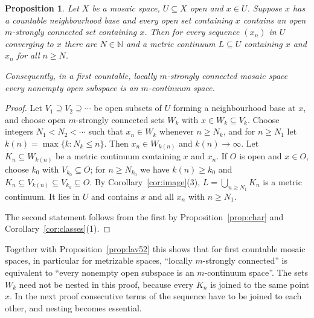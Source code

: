 \documentclass[11pt]{amsart}
\newtheorem{proposition}[theorem]{Proposition}
\theoremstyle{definition}
\theoremstyle{remark}
\newcommand{\N}{\mathbb{N}}
\numberwithin{equation}{section}
\begin{document}
\begin{proposition}\label{prop:fc}
Let $X$ be a mosaic space, $U\subseteq X$ open and $x\in U$. Suppose $x$ has a countable neighbourhood base and every open set containing $x$ contains an open $m$-strongly connected set containing $x$. Then for every sequence $(x_n)$ in $U$ converging to $x$ there are $N\in\N$ and a metric continuum $L\subseteq U$ containing $x$ and $x_n$ for all $n\ge N$.

Consequently, in a first countable, locally $m$-strongly connected mosaic space every nonempty open subspace is an $m$-continuum space.
\end{proposition}
\begin{proof}
Let $V_1\supseteq V_2\supseteq\cdots$ be open subsets of $U$ forming a neighbourhood base at $x$, and choose open $m$-strongly connected sets $W_k$ with $x\in W_k\subseteq V_k$. Choose integers $N_1<N_2<\cdots$ such that $x_n\in W_k$ whenever $n\ge N_k$, and for $n\ge N_1$ let $k(n)=\max\{k:N_k\le n\}$. Then $x_n\in W_{k(n)}$ and $k(n)\to\infty$. Let $K_n\subseteq W_{k(n)}$ be a metric continuum containing $x$ and $x_n$. If $O$ is open and $x\in O$, choose $k_0$ with $V_{k_0}\subseteq O$; for $n\ge N_{k_0}$ we have $k(n)\ge k_0$ and $K_n\subseteq V_{k(n)}\subseteq V_{k_0}\subseteq O$. By Corollary~\ref{cor:image}(3), $L=\bigcup_{n\ge N_1}K_n$ is a metric continuum. It lies in $U$ and contains $x$ and all $x_n$ with $n\ge N_1$.

The second statement follows from the first by Proposition~\ref{prop:char} and Corollary~\ref{cor:classes}(1).
\end{proof}
Together with Proposition~\ref{prop:lav52} this shows that for first countable mosaic spaces, in particular for metrizable spaces, ``locally $m$-strongly connected'' is equivalent to ``every nonempty open subspace is an $m$-continuum space''. The sets $W_k$ need not be nested in this proof, because every $K_n$ is joined to the same point $x$. In the next proof consecutive terms of the sequence have to be joined to each other, and nesting becomes essential.
\end{document}
